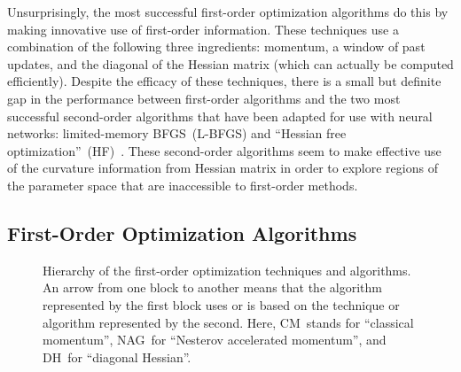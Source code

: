 \documentclass[11pt,a4paper]{article}
\numberwithin{equation}{section}
\begin{document}
Unsurprisingly, the most successful first-order optimization algorithms do this
by making innovative use of first-order information. These techniques use a
combination of the following three ingredients: momentum, a window of past
updates, and the diagonal of the Hessian matrix (which can actually be computed
efficiently). Despite the efficacy of these techniques, there is a small but
definite gap in the performance between first-order algorithms and the two most
successful second-order algorithms that have been adapted for use with neural
networks: limited-memory BFGS~(L-BFGS) and ``Hessian free
optimization''~(HF)~\citep{martens2010deep, ngiam2011optimization,
sutskever2013importance}. These second-order algorithms seem to make effective
use of the curvature information from Hessian matrix in order to explore regions
of the parameter space that are inaccessible to first-order methods.

\subsection{First-Order Optimization Algorithms}

\begin{figure}[t]
\centering
{}
\caption{Hierarchy of the first-order optimization techniques and algorithms.
An arrow from one block to another means that the algorithm represented by the
first block uses or is based on the technique or algorithm represented by the
second. Here, CM~stands for ``classical momentum'', NAG~for ``Nesterov
accelerated momentum'', and DH~for ``diagonal
Hessian''.\label{fig:first_order_hierarchy}}
\end{figure}
\end{document}
